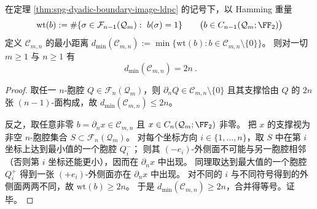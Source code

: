 \begin{corollary}\label{cor:spg-dyadic-boundary-image-min-distance}
在定理 \ref{thm:spg-dyadic-boundary-image-ldpc} 的记号下，以 Hamming 重量
\[
\mathrm{wt}(b):=\#\{\sigma\in\mathcal F_{n-1}(\mathcal Q_m):\ b(\sigma)=1\}
\qquad\bigl(b\in C_{n-1}(\mathcal Q_m;\FF_2)\bigr)
\]
定义 \(\mathcal C_{m,n}\) 的最小距离
\(
d_{\min}(\mathcal C_{m,n}):=\min\{\mathrm{wt}(b):b\in\mathcal C_{m,n}\setminus\{0\}\}
\)。
则对一切 \(m\ge 1\) 与 \(n\ge 1\) 有
\[
\boxed{\ d_{\min}(\mathcal C_{m,n})=2n\ }.
\]
\end{corollary}
\begin{proof}
取任一 \(n\)-胞腔 \(Q\in\mathcal F_n(\mathcal Q_m)\)，则 \(\partial_n Q\in\mathcal C_{m,n}\setminus\{0\}\) 且其支撑恰由 \(Q\) 的 \(2n\) 张 \((n-1)\)-面构成，故 \(d_{\min}(\mathcal C_{m,n})\le 2n\)。
\par
反之，取任意非零 \(b=\partial_n x\in\mathcal C_{m,n}\) 且 \(x\in C_n(\mathcal Q_m;\FF_2)\) 非零。
把 \(x\) 的支撑视为非空 \(n\)-胞腔集合 \(S\subset\mathcal F_n(\mathcal Q_m)\)。
对每个坐标方向 \(i\in\{1,\dots,n\}\)，取 \(S\) 中在第 \(i\) 坐标上达到最小值的一个胞腔 \(Q_i^{-}\)；
则其 \((-e_i)\)-外侧面不可能与另一胞腔相邻（否则第 \(i\) 坐标还能更小），因而在 \(\partial_n x\) 中出现。
同理取达到最大值的一个胞腔 \(Q_i^{+}\) 得到一张 \((+e_i)\)-外侧面亦在 \(\partial_n x\) 中出现。
对不同的 \(i\) 与不同符号得到的外侧面两两不同，故 \(\mathrm{wt}(b)\ge 2n\)。
于是 \(d_{\min}(\mathcal C_{m,n})\ge 2n\)，合并得等号。证毕。
\end{proof}

\endinput

